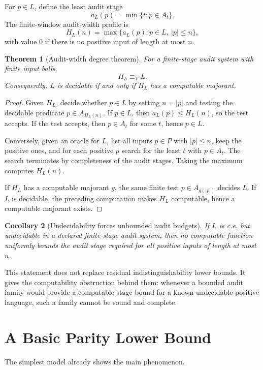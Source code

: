 \documentclass[11pt]{article}
\newtheorem{theorem}{Theorem}[section]
\newtheorem{corollary}[theorem]{Corollary}
\theoremstyle{definition}
\begin{document}
For \(p\in L\), define the least audit stage
\[
a_L(p)=\min\{t:p\in A_t\}.
\]
The finite-window audit-width profile is
\[
H_L(n)=\max\{a_L(p):p\in L,\ |p|\leq n\},
\]
with value \(0\) if there is no positive input of length at most \(n\).

\begin{theorem}[Audit-width degree theorem]
For a finite-stage audit system with finite input balls,
\[
H_L\equiv_T L.
\]
Consequently, \(L\) is decidable if and only if \(H_L\) has a computable majorant.
\end{theorem}

\begin{proof}
Given \(H_L\), decide whether \(p\in L\) by setting \(n=|p|\) and testing the decidable predicate \(p\in A_{H_L(n)}\).  If \(p\in L\), then \(a_L(p)\leq H_L(n)\), so the test accepts.  If the test accepts, then \(p\in A_t\) for some \(t\), hence \(p\in L\).

Conversely, given an oracle for \(L\), list all inputs \(p\in P\) with \(|p|\leq n\), keep the positive ones, and for each positive \(p\) search for the least \(t\) with \(p\in A_t\).  The search terminates by completeness of the audit stages.  Taking the maximum computes \(H_L(n)\).

If \(H_L\) has a computable majorant \(g\), the same finite test \(p\in A_{g(|p|)}\) decides \(L\).  If \(L\) is decidable, the preceding computation makes \(H_L\) computable, hence a computable majorant exists.
\end{proof}

\begin{corollary}[Undecidability forces unbounded audit budgets]
If \(L\) is c.e. but undecidable in a declared finite-stage audit system, then no computable function uniformly bounds the audit stage required for all positive inputs of length at most \(n\).
\end{corollary}

This statement does not replace residual indistinguishability lower bounds.  It gives the computability obstruction behind them: whenever a bounded audit family would provide a computable stage bound for a known undecidable positive language, such a family cannot be sound and complete.

\section{A Basic Parity Lower Bound}

The simplest model already shows the main phenomenon.
\end{document}
